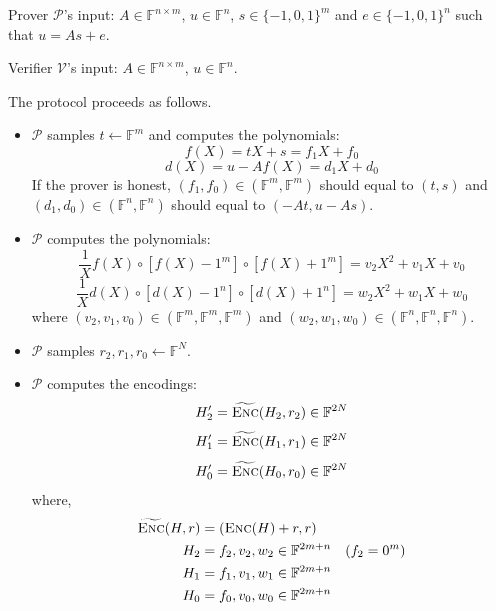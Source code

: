 Prover $\mathcal{P}$'s input: $A \in \mathbb{F}^{n \times m}$, $u \in \mathbb{F}^{n}$, $s \in \{-1, 0, 1\}^{m}$ and $e \in \{-1, 0, 1\}^{n}$ such that $u = As + e$.

Verifier $\mathcal{V}$'s input: $A \in \mathbb{F}^{n \times m}$, $u \in \mathbb{F}^{n}$.

The protocol proceeds as follows.



\begin{itemize}
    \item $\mathcal{P}$ samples $t \leftarrow \mathbb{F}^{m}$ and computes the polynomials:
\begin{equation}
\label{eq:lwe3}
    f(X) = tX+s = f_1 X + f_0
\end{equation}
\begin{equation}
\label{eq:lwe4}
    d(X)=u-Af(X) = d_1 X + d_0
\end{equation}
If the prover is honest, $(f_1, f_0) \in (\mathbb{F}^m, \mathbb{F}^m)$ should equal to $(t, s)$ and $(d_1, d_0) \in (\mathbb{F}^n, \mathbb{F}^n)$ should equal to $(-At, u-As)$.

    \item $\mathcal{P}$ computes the polynomials:
\begin{equation}
\label{eq:lwe1}
    \frac{1}{X} f(X) \circ [f(X) - 1^m] \circ [f(X) + 1^m] = v_2X^2 + v_1X + v_0
\end{equation}
\begin{equation}
\label{eq:lwe2}
    \frac{1}{X} d(X) \circ [d(X) - 1^n] \circ [d(X) + 1^n] = w_2X^2 + w_1X + w_0
\end{equation}
where $(v_2, v_1, v_0) \in (\mathbb{F}^m, \mathbb{F}^m, \mathbb{F}^m)$ and $(w_2, w_1, w_0) \in (\mathbb{F}^n, \mathbb{F}^n, \mathbb{F}^n)$.

    \item $\mathcal{P}$ samples $r_2, r_1, r_0 \leftarrow \mathbb{F}^N$.


    \item $\mathcal{P}$ computes the encodings:
\begin{equation*}
    H_2^\prime = \widetilde{\textsc{Enc}}(H_2, r_2) \in \mathbb{F}^{2N}
\end{equation*}
\begin{equation*}
    H_1^\prime = \widetilde{\textsc{Enc}}(H_1, r_1) \in \mathbb{F}^{2N}
\end{equation*}
\begin{equation*}
    H_0^\prime = \widetilde{\textsc{Enc}}(H_0, r_0) \in \mathbb{F}^{2N}
\end{equation*}
where, 
\begin{align*}
    \widetilde{\textsc{Enc}}(H, r) &= (\textsc{Enc}(H) + r, r) \\ 
    H_2 &= f_2, v_2, w_2
    \in \mathbb{F}^{2m+n} \quad (f_2 = 0^m) \\
    H_1 &= f_1, v_1, w_1
    \in \mathbb{F}^{2m+n} \\
    H_0 &= f_0, v_0, w_0
    \in \mathbb{F}^{2m+n}
\end{align*}


\end{itemize}
